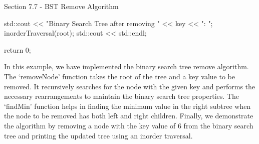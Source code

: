 \begin{notes}{Section 7.7 - BST Remove Algorithm}
\begin{highlight}
\begin{code}[C++]
{        std::cout << "Binary Search Tree after removing " << key << ": ";
        inorderTraversal(root);
        std::cout << std::endl;
    
        return 0;
    }
    \end{code}
        In this example, we have implemented the binary search tree remove algorithm. The `removeNode' function takes the root of the tree and a key value to be removed. It recursively searches for the node with the given key and performs the necessary rearrangements to maintain the binary search tree properties. The `findMin' function 
        helps in finding the minimum value in the right subtree when the node to be removed has both left and right children. Finally, we demonstrate the algorithm by removing a node with the key value of 6 from the binary search tree and printing the updated tree using an inorder traversal.
    \end{highlight}
\end{notes}

